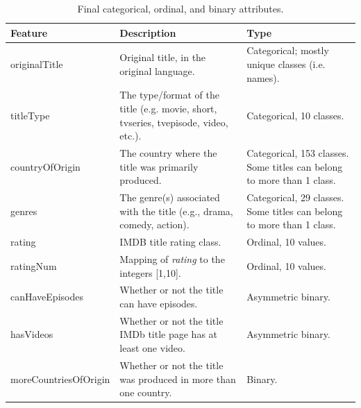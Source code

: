 \begin{table}[h]
    \centering
    \renewcommand{\arraystretch}{1.2}
    \scriptsize
    \begin{tabular}{|p{3cm}|p{6cm}|p{3cm}|}
    \hline
    \textbf{Feature} & \textbf{Description} & \textbf{Type} \\ \hline
    originalTitle & Original title, in the original language. & Categorical; mostly unique classes (i.e. names). \\ \hline
    titleType & The type/format of the title (e.g. movie, short, tvseries, tvepisode, video, etc.). & Categorical, 10 classes. \\ \hline
    countryOfOrigin & The country where the title was primarily produced. & Categorical, 153 classes. Some titles can belong to more than 1 class. \\ \hline
    genres & The genre(s) associated with the title (e.g., drama, comedy, action). & Categorical, 29 classes. Some titles can belong to more than 1 class. \\ \hline
    rating & IMDB title rating class. & Ordinal, 10 values. \\ \hline
    ratingNum & Mapping of \textit{rating} to the integers [1,10]. & Ordinal, 10 values. \\ \hline
    canHaveEpisodes & Whether or not the title can have episodes. & Asymmetric binary. \\ \hline
    hasVideos & Whether or not the title IMDb title page has at least one video. & Asymmetric binary. \\ \hline
    moreCountriesOfOrigin & Whether or not the title was produced in more than one country. & Binary. \\ \hline
    \end{tabular}
    \caption{Final categorical, ordinal, and binary attributes.}
    \label{tab:dataset_categorical}
\end{table}
